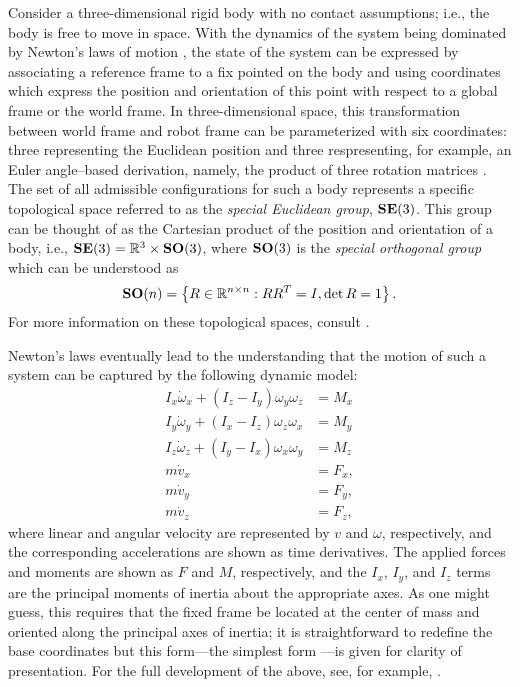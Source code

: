 Consider a three-dimensional rigid body with no contact assumptions; i.e., the
body is free to move in space.
%
With the dynamics of the system being dominated by Newton's laws of motion
\cite{Feynman1964}, the state of the system can be expressed by associating a
reference frame to a fix pointed on the body and using coordinates which express
the position and orientation of this point with respect to a global frame or the
world frame.
%
In three-dimensional space, this transformation between world frame and robot
frame can be parameterized with six coordinates: three representing the
Euclidean position and three respresenting, for example, an Euler angle--based
derivation, namely, the product of three rotation matrices
\cite[Ch. 7]{Baruh1998}.
%
The set of all admissible configurations for such a body represents a specific
topological space referred to as the {\em special Euclidean group}, $\mathbf{SE}(3)$.
%
This group can be thought of as the Cartesian product of the position and
orientation of a body, i.e., $\mathbf{SE}(3) = \mathbb{R}^3 \times \mathbf{SO}(3)$, where $\mathbf{SO}(3)$ is
the {\em special orthogonal group} which can be understood as
\begin{align*}
  \mathbf{SO}(n) = \left\{ R \in \mathbb{R}^{n \times n} : R R^T = I, \det R = 1 \right\}.
\end{align*}
For more information on these topological spaces, consult
\cite[Ch. 2]{Murray1994}.


Newton's laws eventually lead to the understanding that the motion of such a
system can be captured by the following dynamic model:
\begin{align*}
  I_{x} \dot{\omega}_{x} + (I_{z} - I_{y}) \omega_{y} \omega_{z} &= M_{x}\\
  I_{y} \dot{\omega}_{y} + (I_{x} - I_{z}) \omega_{z} \omega_{x} &= M_{y}\\
  I_{z} \dot{\omega}_{z} + (I_{y} - I_{x}) \omega_{x} \omega_{y} &= M_{z}\\
  m \dot{v}_{x} &= F_{x},\\
  m \dot{v}_{y} &= F_{y},\\
  m \dot{v}_{z} &= F_{z},
\end{align*}
where linear and angular velocity are represented by $v$ and $\omega$,
respectively, and the corresponding accelerations are shown as time
derivatives.
%
The applied forces and moments are shown as $F$ and $M$, respectively, and the
$I_{x}$, $I_{y}$, and $I_{z}$ terms are the principal moments of inertia about
the appropriate axes.
%
As one might guess, this requires that the fixed frame be located at the center
of mass and oriented along the principal axes of inertia; it is straightforward
to redefine the base coordinates but this form---the simplest form ---is given
for clarity of presentation.
%
For the full development of the above, see, for example,
\cite[Ch. 8]{Baruh1998}.

